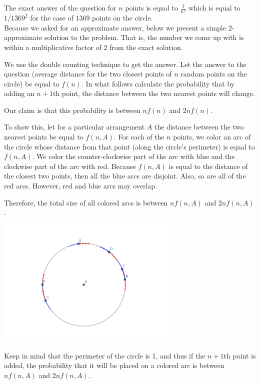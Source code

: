 \begin{solution}
The exact answer of the question for $n$ points is equal to $\frac{1}{n^2}$ which is equal to $1/1369^2$ for the case of $1369$ points on the circle.\\[0.2cm]

Because we asked for an approximate answer, below we present a simple $2$-approximate solution to the problem. That is, the number we come up with is within a multiplicative factor of 2 from the exact solution.

We use the double counting technique to get the answer. Let the answer to the question (average distance for the two closest points of $n$ random points on the circle) be equal to $f(n)$. In what follows calculate the probability that by adding an $n+1$th point, the distance between the two nearest points will change.

Our claim is that this probability is between $nf(n)$ and $2nf(n)$.

To show this, let for a particular arrangement $A$ the distance between the two nearest points be equal to $f(n,A)$.
For each of the $n$ points, we color an arc of the circle whose distance from that point (along the circle's perimeter) is equal to $f(n,A)$.
We color the counter-clockwise part of the arc with blue and the clockwise part of the arc with red.
Because $f(n,A)$ is equal to the distance of the closest two points, then all the blue arcs are disjoint.
Also, so are all of the red arcs.
However, red and blue arcs may overlap.

Therefore, the total size of all colored arcs is between
$nf(n,A)$
and
$2nf(n,A)$.

\begin{center}
	\includegraphics[width=9cm]{30/figs/30_diagram1.png}
\end{center}

Keep in mind that the perimeter of the circle is 1, and thus if the $n+1$th point is added, the probability that it will be placed on a colored arc is between
$n f(n,A)$
and
$2nf(n,A)$.


\end{solution}
